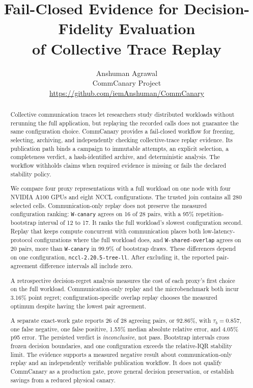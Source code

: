 \documentclass[10pt,twocolumn]{article}
\title{Fail-Closed Evidence for Decision-Fidelity Evaluation\\
  of Collective Trace Replay}
\author{Anshuman Agrawal\\
  \small CommCanary Project\\
  \small\url{https://github.com/iemAnshuman/CommCanary}}
\date{}
\newcommand{\wname}[1]{\texttt{W-#1}}
\begin{document}
\maketitle

\begin{abstract}
Collective communication traces let researchers study distributed workloads
without rerunning the full application, but replaying the recorded calls does
not guarantee the same configuration choice. CommCanary provides a fail-closed
workflow for freezing, selecting, archiving, and independently checking collective-trace
replay evidence. Its publication path binds a campaign to immutable attempts,
an explicit selection, a completeness verdict, a hash-identified archive, and
deterministic analysis. The workflow withholds claims when required evidence
is missing or fails the declared stability policy.

We compare four proxy representations with a full workload on one node with
four NVIDIA A100 GPUs and eight NCCL configurations. The trusted join contains
all 280 selected cells. Communication-only replay does not preserve the
measured configuration ranking: \wname{canary} agrees on 16 of 28 pairs, with
a 95\% repetition-bootstrap interval of 12 to 17. It ranks the full
workload's slowest configuration second. Replay that keeps compute concurrent
with communication places both low-latency-protocol configurations where the
full workload does, and \wname{shared-overlap} agrees on 20 pairs, more
than \wname{canary} in 99.9\% of bootstrap draws. These differences depend on
one configuration, \texttt{nccl-2.20.5-tree-ll}. After excluding it, the
reported pair-agreement difference intervals all include zero.

A retrospective decision-regret analysis measures the cost of each proxy's
first choice on the full workload. Communication-only replay and the
microbenchmark both incur 3.16\% point regret; configuration-specific overlap
replay chooses the measured optimum despite having the lowest pair agreement.

A separate exact-work gate reports 26 of 28 agreeing pairs, or 92.86\%, with
$\tau_b=0.857$, one false negative, one false positive, 1.55\% median absolute
relative error, and 4.05\% p95 error. The persisted verdict is
\emph{inconclusive}, not pass. Bootstrap intervals cross frozen decision
boundaries, and one configuration exceeds the relative-IQR stability limit.
The evidence supports a measured negative result about communication-only
replay and an independently verifiable publication workflow. It does not
qualify CommCanary as a production gate, prove general decision preservation,
or establish savings from a reduced physical canary.
\end{abstract}
\end{document}
